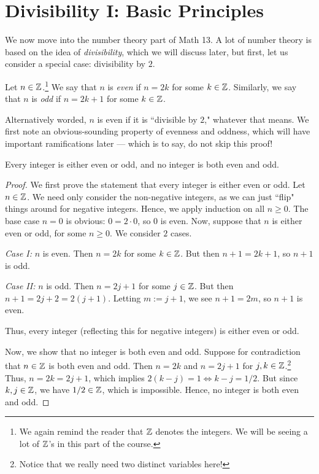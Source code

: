 \documentclass{article}
\begin{document}
\section{Divisibility I: Basic Principles}
We now move into the number theory part of Math 13. A lot of number theory is based on the idea of \textit{divisibility}, which we will discuss later, but first, let us consider a special case: divisibility by $2$.
\begin{definition}
Let $n\in \mathbb Z$.\footnote{We again remind the reader that $\mathbb Z$ denotes the integers. We will be seeing a lot of $\mathbb Z$'s in this part of the course.} We say that $n$ is \textit{even} if $n = 2k$ for some $k\in \mathbb Z$. Similarly, we say that $n$ is \textit{odd} if $n = 2k+1$ for some $k\in\mathbb Z$.
\end{definition}
Alternatively worded, $n$ is even if it is ``divisible by $2$," whatever that means. We first note an obvious-sounding property of evenness and oddness, which will have important ramifications later --- which is to say, do not skip this proof!
\begin{proposition}
Every integer is either even or odd, and no integer is both even and odd.
\end{proposition}
\begin{proof}
We first prove the statement that every integer is either even or odd. Let $n\in \mathbb Z$. We need only consider the non-negative integers, as we can just ``flip" things around for negative integers. Hence, we apply induction on all $n \geq 0$. The base case $n=0$ is obvious: $0 = 2\cdot 0$, so $0$ is even. Now, suppose that $n$ is either even or odd, for some $n \geq 0$. We consider $2$ cases.

\textit{Case I:} $n$ is even. Then $n = 2k$ for some $k\in\mathbb Z$. But then $n+1 = 2k+1$, so $n+1$ is odd.

\textit{Case II:} $n$ is odd. Then $n = 2j+1$ for some $j\in\mathbb Z$. But then $n+1 = 2j+2 = 2(j+1)$. Letting $m := j+1$, we see $n+1 = 2m$, so $n+1$ is even.

Thus, every integer (reflecting this for negative integers) is either even or odd.

Now, we show that no integer is both even and odd. Suppose for contradiction that $n\in\mathbb Z$ is both even and odd. Then $n = 2k$ and $n = 2j+1$ for $j,k\in\mathbb Z$.\footnote{Notice that we really need two distinct variables here!} Thus, $n = 2k = 2j+1$, which implies $2(k-j) = 1 \iff k-j = 1/2$. But since $k, j\in \mathbb Z$, we have $1/2\in \mathbb Z$, which is impossible. Hence, no integer is both even and odd.
\end{proof}
\end{document}

